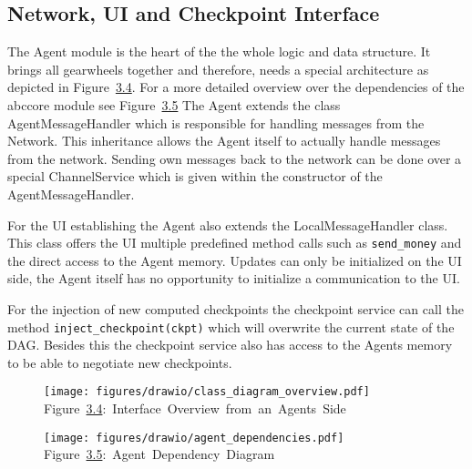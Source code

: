 \subsection{Network, UI and Checkpoint Interface}
The Agent module is the heart of the the whole logic and data structure. It brings all gearwheels together and therefore, needs a special architecture as depicted in Figure~\hyperref[interface_overview]{3.4}.
For a more detailed overview over the dependencies of the abccore module see Figure~\hyperref[agent_dependencies]{3.5}
The Agent extends the class AgentMessageHandler which is responsible for handling messages from the Network.
This inheritance allows the Agent itself to actually handle messages from the network.
Sending own messages back to the network can be done over a special ChannelService which is given within the constructor of the AgentMessageHandler.

For the UI establishing the Agent also extends the LocalMessageHandler class. This class offers the UI multiple predefined method calls such as \texttt{send\_money} and the direct access to the Agent memory.
Updates can only be initialized on the UI side, the Agent itself has no opportunity to initialize a communication to the UI.

For the injection of new computed checkpoints the checkpoint service can call the method \texttt{inject\_checkpoint(ckpt)} which will overwrite the current state of the DAG.
Besides this the checkpoint service also has access to the Agents memory to be able to negotiate new checkpoints. 

\begin{figure}[h]
	\centering
	\texttt{[image: figures/drawio/class\_diagram\_overview.pdf]}
    \footnotesize{Figure~\hyperref[interface_overview]{3.4}:~Interface~Overview~from~an~Agents~Side}
    \label{interface_overview}
\end{figure}

\begin{figure}[h]
	\centering
	\texttt{[image: figures/drawio/agent\_dependencies.pdf]}
	\footnotesize{Figure~\hyperref[interface_overview]{3.5}:~Agent~Dependency~Diagram}
	\label{agent_dependencies}
\end{figure}


